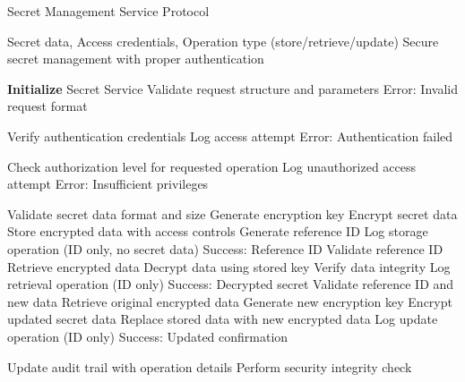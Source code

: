 \begin{algorithm}
\caption{Secret Management Service Protocol}
\label{alg:secret-service}
\begin{algorithmic}[1]
\Require Secret data, Access credentials, Operation type (store/retrieve/update)
\Ensure Secure secret management with proper authentication

\State \textbf{Initialize} Secret Service
\State Validate request structure and parameters
    \State \Return Error: Invalid request format
\EndIf

\State Verify authentication credentials
    \State Log access attempt
    \State \Return Error: Authentication failed
\EndIf

\State Check authorization level for requested operation
    \State Log unauthorized access attempt
    \State \Return Error: Insufficient privileges
\EndIf

    \State Validate secret data format and size
    \State Generate encryption key
    \State Encrypt secret data
    \State Store encrypted data with access controls
    \State Generate reference ID
    \State Log storage operation (ID only, no secret data)
    \State \Return Success: Reference ID
    \State Validate reference ID
    \State Retrieve encrypted data
    \State Decrypt data using stored key
    \State Verify data integrity
    \State Log retrieval operation (ID only)
    \State \Return Success: Decrypted secret
    \State Validate reference ID and new data
    \State Retrieve original encrypted data
    \State Generate new encryption key
    \State Encrypt updated secret data
    \State Replace stored data with new encrypted data
    \State Log update operation (ID only)
    \State \Return Success: Updated confirmation
\EndIf

\State Update audit trail with operation details
\State Perform security integrity check

\end{algorithmic}
\end{algorithm} 
